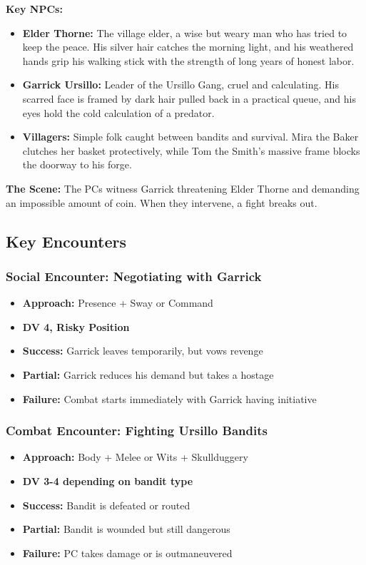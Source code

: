 \documentclass[11pt]{article}
\newenvironment{encounterbox}[1]{%
  \begin{mdframed}[backgroundcolor=encountercolor!30, linewidth=1pt, linecolor=accentcolor]%
  \subsubsection*{#1}%
}{%
  \end{mdframed}%
}
\begin{document}
\textbf{Key NPCs:}
\begin{itemize}
\item \textbf{Elder Thorne:} The village elder, a wise but weary man who has tried to keep the peace. His silver hair catches the morning light, and his weathered hands grip his walking stick with the strength of long years of honest labor.
\item \textbf{Garrick Ursillo:} Leader of the Ursillo Gang, cruel and calculating. His scarred face is framed by dark hair pulled back in a practical queue, and his eyes hold the cold calculation of a predator.
\item \textbf{Villagers:} Simple folk caught between bandits and survival. Mira the Baker clutches her basket protectively, while Tom the Smith's massive frame blocks the doorway to his forge.
\end{itemize}

\textbf{The Scene:} The PCs witness Garrick threatening Elder Thorne and demanding an impossible amount of coin. When they intervene, a fight breaks out.

\subsection{Key Encounters}

\begin{encounterbox}{Social Encounter: Negotiating with Garrick}
\begin{itemize}
\item \textbf{Approach:} Presence + Sway or Command
\item \textbf{DV 4, Risky Position}
\item \textbf{Success:} Garrick leaves temporarily, but vows revenge
\item \textbf{Partial:} Garrick reduces his demand but takes a hostage
\item \textbf{Failure:} Combat starts immediately with Garrick having initiative
\end{itemize}
\end{encounterbox}

\begin{encounterbox}{Combat Encounter: Fighting Ursillo Bandits}
\begin{itemize}
\item \textbf{Approach:} Body + Melee or Wits + Skullduggery
\item \textbf{DV 3-4 depending on bandit type}
\item \textbf{Success:} Bandit is defeated or routed
\item \textbf{Partial:} Bandit is wounded but still dangerous
\item \textbf{Failure:} PC takes damage or is outmaneuvered
\end{itemize}
\end{encounterbox}
\end{document}
